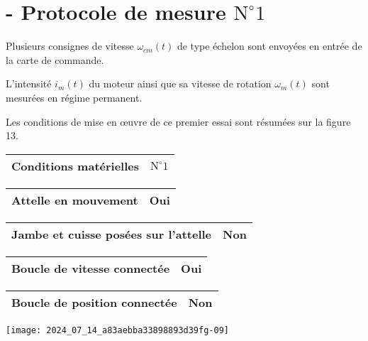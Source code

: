 \section*{- Protocole de mesure $\mathrm{N}^{\circ} 1$}
Plusieurs consignes de vitesse $\omega_{c m}(t)$ de type échelon sont envoyées en entrée de la carte de commande.

L'intensité $i_{m}(t)$ du moteur ainsi que sa vitesse de rotation $\omega_{m}(t)$ sont mesurées en régime permanent.

Les conditions de mise en œuvre de ce premier essai sont résumées sur la figure 13.

\begin{center}
\begin{tabular}{|l|l|}
\hline
Conditions matérielles & $\mathrm{N}^{\circ} 1$ \\
\hline
\end{tabular}
\end{center}

\begin{center}
\begin{tabular}{|l|l|}
\hline
Attelle en mouvement & Oui \\
\hline
\end{tabular}
\end{center}

\begin{center}
\begin{tabular}{|l|l|}
\hline
Jambe et cuisse posées sur l'attelle & Non \\
\hline
\end{tabular}
\end{center}

\begin{center}
\begin{tabular}{|l|l|}
\hline
Boucle de vitesse connectée & Oui \\
\hline
\end{tabular}
\end{center}

\begin{center}
\begin{tabular}{|l|l|}
\hline
Boucle de position connectée & Non \\
\hline
\end{tabular}
\end{center}

\begin{center}
\texttt{[image: 2024\_07\_14\_a83aebba33898893d39fg-09]}
\end{center}


